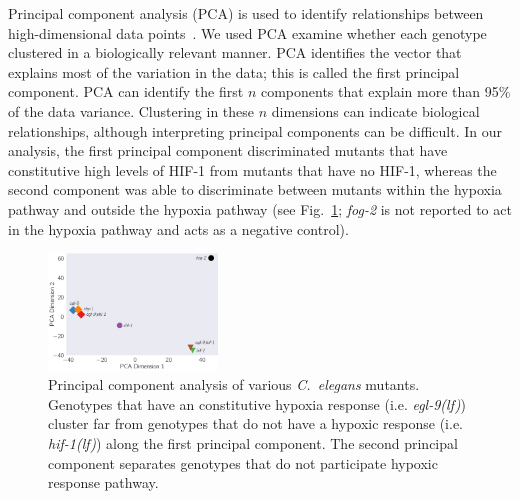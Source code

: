 \documentclass[9pt,twocolumn,twoside]{pnas-new}
\newcommand{\cel}{\emph{C.~elegans}}
\newcommand{\gene}[1]{\mbox{\emph{#1}}}
\newcommand{\fog}{\gene{fog-2(lf)}}
\newcommand{\egl}{\gene{egl-9(lf)}}
\newcommand{\rhy}{\gene{rhy-1(lf)}}
\newcommand{\vhl}{\gene{vhl-1(lf)}}
\newcommand{\eglvhl}{\gene{egl-9(lf); vhl-1(lf)}}
\newcommand{\eglhif}{\gene{egl-9(lf) hif-1(lf)}}
\newcommand{\hif}{\gene{hif-1(lf)}}
\newcommand{\hifp}{HIF-1}
\begin{document}
Principal component analysis (PCA) is used to identify relationships between
high-dimensional data points~\cite{Yeung2001}. We used PCA
examine whether each genotype clustered in a biologically relevant manner. PCA
identifies the vector that explains most of the variation in the data; this
is called the first principal component. PCA can identify the first
$n$ components that explain more than 95\% of the data variance.
Clustering in these $n$ dimensions can indicate biological
relationships, although interpreting principal components can be
difficult.
In our analysis, the first principal component discriminated mutants
that have constitutive high levels of \hifp{} from mutants that have no \hifp{},
whereas the second component was able to discriminate between mutants within the
hypoxia pathway and outside the hypoxia pathway (see Fig.~\ref{fig:pca};
\gene{fog-2} is not reported to act in the hypoxia pathway and acts as a
negative control).

\begin{figure}[tbhp]
  \centering
  \includegraphics[width=0.4\textwidth]{../figs/pca.pdf}
  \caption{
    Principal component analysis of various \cel{} mutants. Genotypes that have
    an constitutive hypoxia response (i.e. \egl{}) cluster far from genotypes
    that do not have a hypoxic response (i.e. \hif{}) along the first principal
    component. The second principal component separates genotypes that do not
    participate hypoxic response pathway.
  }
\label{fig:pca}
\end{figure}
\end{document}

